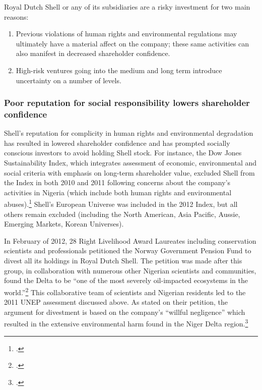 Royal Dutch Shell or any of its subsidiaries are a risky investment for two main reasons:
\begin{enumerate}
	\item Previous violations of human rights and environmental regulations may ultimately have a material affect on the company; these same activities can also manifest in decreased shareholder confidence.
	\item High-risk ventures going into the medium and long term introduce uncertainty on a number of levels.
\end{enumerate}

	
	
	\subsubsection{Poor reputation for social responsibility lowers shareholder confidence}
	

	
Shell's reputation for complicity in human rights and environmental degradation has resulted in lowered shareholder confidence and has prompted socially conscious investors to avoid holding Shell stock.
For instance, the Dow Jones Sustainability Index, which integrates assessment of economic, environmental and social criteria with emphasis on long-term shareholder value, excluded Shell from the Index in both 2010 and 2011 following concerns about the company's activities in Nigeria (which include both human rights and environmental abuses).\footcite{ShellIndex}
Shell's European Universe was included in the 2012 Index, but all others remain excluded (including the North American, Asia Pacific, Aussie, Emerging Markets, Korean Universes).



In February of 2012, 28 Right Livelihood Award Laureates including conservation scientists and professionals petitioned the Norway Government Pension Fund to divest all its holdings in Royal Dutch Shell. 
The petition was made after this group, in collaboration with numerous other Nigerian scientists and communities, found the Delta to be ``one of the most severely oil-impacted ecosystems in the world.''\footcite[][]{NigerDeltaReport_2006}
This collaborative team of scientists and Nigerian residents led to the 2011 UNEP assessment discussed above.
As stated on their petition, the argument for divestment is based on the company's ``willful negligence'' which resulted in the extensive environmental harm found in the Niger Delta region.\footcite[][]{NorwayPetition_2012}



